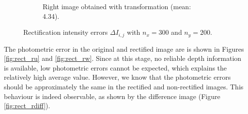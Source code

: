 \begin{figure}[h]
\begin{subfigure}[b]{0.7\textwidth}
    \caption{Right image obtained with transformation (mean: 4.34).}
    \label{fig:rect_r2_transform}
  \end{subfigure}
  \caption{Rectification intensity errors $\Delta I_{i,j}$ with $n_x = 300$ and $n_y = 200$.}
\end{figure}

The photometric error in the original and rectified image are is shown in Figures
\ref{fig:rect_ru} and \ref{fig:rect_rw}. Since at this stage, no reliable depth
information is available, low photometric errors cannot be expected, which explains 
the relatively high average value. However, we know that the photometric errors should 
be approximately the same in the rectified and non-rectified images.
This behaviour is indeed observable, as shown by the difference image (Figure
\ref{fig:rect_rdiff}).

